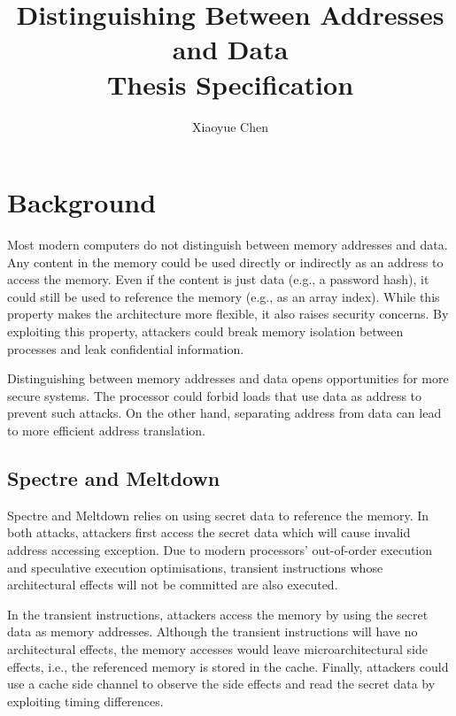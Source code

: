 \documentclass[a4paper]{article}
\title{Distinguishing Between Addresses and Data\\Thesis Specification}
\author{Xiaoyue Chen}
\begin{document}
\maketitle

\section{Background}
Most modern computers do not distinguish between memory addresses and
data. Any content in the memory could be used directly or indirectly
as an address to access the memory. Even if the content is just data
(e.g., a password hash), it could still be used to reference the
memory (e.g., as an array index). While this property makes the
architecture more flexible, it also raises security concerns. By
exploiting this property, attackers could break memory isolation
between processes and leak confidential information.

Distinguishing between memory addresses and data opens opportunities
for more secure systems. The processor could forbid loads that use
data as address to prevent such attacks. On the other hand,
separating address from data can lead to more efficient address
translation.

\subsection{Spectre and Meltdown}
Spectre \cite{kocher2019spectre} and Meltdown \cite{lipp2018meltdown}
relies on using secret data to reference the memory. In both attacks,
attackers first access the secret data which will cause invalid
address accessing exception. Due to modern processors' out-of-order
execution and speculative execution optimisations, transient
instructions whose architectural effects will not be committed are
also executed.

In the transient instructions, attackers access the memory by using
the secret data as memory addresses. Although the transient
instructions will have no architectural effects, the memory accesses
would leave microarchitectural side effects, i.e., the referenced
memory is stored in the cache. Finally, attackers could use a cache
side channel to observe the side effects and read the secret data by
exploiting timing differences.
\end{document}
